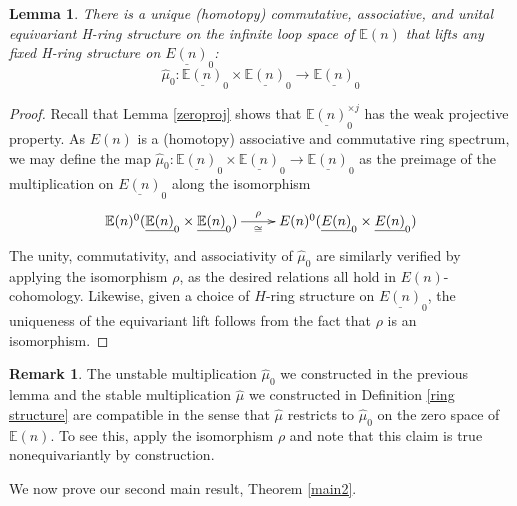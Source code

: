 \documentclass[12pt]{amsart}
\numberwithin{equation}{section}
\theoremstyle{plain}  %
\newtheorem{lemma}[equation]{Lemma}
\theoremstyle{definition}  %
\newtheorem{remark}[equation]{Remark}
\newcommand{\E}{\mathbb{E}}
\renewcommand{\sp}[2]{\underline{#1}_{#2}}
\begin{document}
\medskip
\begin{lemma}\label{zerospace}
There is a unique (homotopy) commutative, associative, and unital equivariant H-ring structure on the infinite loop space of $\E(n)$ that lifts any fixed H-ring structure on $\underline{E(n)}_0$:
$$\hat{\mu}_0 : \underline{\E(n)}_0 \times \underline{\E(n)}_0 \longrightarrow \underline{\E(n)}_0$$
\end{lemma}
\begin{proof} Recall that Lemma \ref{zeroproj} shows that $\sp{\E(n)}{0}^{\times j}$ has the weak projective property. As $E(n)$ is a (homotopy) associative and commutative ring spectrum, we may define the map $\hat{\mu}_0: \underline{\E(n)}_0 \times \underline{\E(n)}_0 \longrightarrow \underline{\E(n)}_0$ as the preimage of the multiplication on $\underline{E(n)}_0$ along the isomorphism
$$\xymatrix{\E(n)^0(\underline{\E(n)}_0\times \underline{\E(n)}_0) \ar@{->}[r]^-{\rho}_-{\cong} & E(n)^0(\underline{E(n)}_0 \times \underline{E(n)}_0)}$$
The unity, commutativity, and associativity of $\hat{\mu}_0$ are similarly verified by applying the isomorphism $\rho$, as the desired relations all hold in $E(n)$-cohomology. Likewise, given a choice of $H$-ring structure on $\sp{E(n)}{0}$, the uniqueness of the equivariant lift follows from the fact that $\rho$ is an isomorphism.
\end{proof}

\medskip
\begin{remark}
The unstable multiplication $\hat{\mu}_0$ we constructed in the previous lemma and the stable multiplication $\hat{\mu}$ we constructed in Definition \ref{ring structure} are compatible in the sense that $\hat{\mu}$ restricts to $\hat{\mu}_0$ on the zero space of $\E(n)$. To see this, apply the isomorphism $\rho$ and note that this claim is true nonequivariantly by construction.
\end{remark}

\medskip


\medskip
We now prove our second main result, Theorem \ref{main2}.
\end{document}
